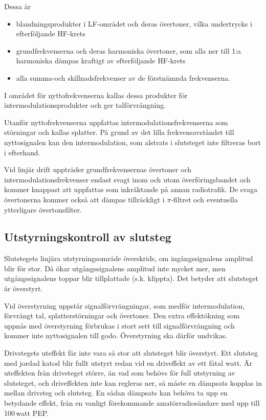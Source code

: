 Dessa är
\begin{itemize}
\item blandningsprodukter i LF-området och deras övertoner, vilka
  undertrycks i efterföljande HF-krets

\item grundfrekvenserna och deras harmoniska övertoner, som alla ner
  till 1:a harmoniska dämpas kraftigt av efterföljande HF-krets

\item alla summa-och skillnadsfrekvenser av de förstnämnda frekvenserna.
\end{itemize}

I området för nyttofrekvenserna kallas dessa produkter för
intermodulationsprodukter och ger talförvrängning.

Utanför nyttofrekvenserna uppfattas intermodulationsfrekvenserna som
störningar och kallas splatter.
På grund av det lilla frekvensavståndet till nyttosignalen kan den
intermodulation, som alstrats i slutsteget inte filtreras bort i efterhand.

Vid linjär drift uppträder grundfrekvensernas övertoner och
intermodulationsfrekvenser endast svagt inom och utom
överföringsbandet och kommer knappast att uppfattas som inkräktande på
annan radiotrafik.
De svaga övertonerna kommer också att dämpas tillräckligt i \(\pi \)-filtret
och eventuella ytterligare övertonsfilter.


\subsection{Utstyrningskontroll av slutsteg}

Slutstegets linjära utstyrningsområde överskrids, om ingångssignalens
amplitud blir för stor.
Då ökar utgångssignalens amplitud inte mycket mer, men utgångssignalens toppar
blir tillplattade (s.k. klippta).
Det betyder att slutsteget är överstyrt.

Vid överstyrning uppstår signalförvrängningar, som medför intermodulation,
förvrängt tal, splatterstörningar och övertoner.
Den extra effektökning som uppnås med överstyrning förbrukas i stort sett
till signalförvrängning och kommer inte nyttosignalen till godo.
Överstyrning ska därför undvikas.

Drivstegets uteffekt får inte vara så stor att slutsteget blir överstyrt.
Ett slutsteg med jordad katod blir fullt utstyrt redan vid en driveffekt av ett
fåtal watt.
Är uteffekten från drivsteget större, än vad som behövs för full utstyrning av
slutsteget, och driveffekten inte kan regleras ner, så måste en dämpsats
kopplas in mellan drivsteg och slutsteg.
En sådan dämpsats kan behöva ta upp en betydande effekt, från en vanligt
förekommande amatörradiosändare med upp till 100\,watt PEP.

